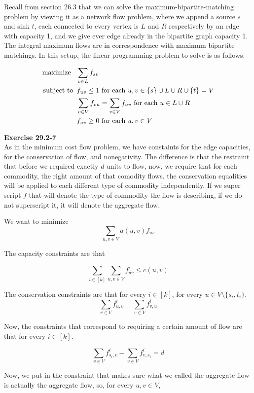 \documentclass{article}
\begin{document}
Recall from section 26.3 that we can solve the maximum-bipartite-matching problem by viewing it as a network flow problem, where we append a source $s$ and sink $t$, each connected to every vertex is $L$ and $R$ respectively by an edge with capacity 1, and we give ever edge already in the bipartite graph capacity 1.  The integral maximum flows are in correspondence with maximum bipartite matchings. In this setup, the linear programming problem to solve is as follows:

\begin{align*}
\mbox{maximize \,\,\,} & \sum_{v \in L} f_{sv}\\
\mbox{subject to \,} & f_{uv} \leq 1 \mbox{ for each } u,v \in \{s\} \cup L \cup R \cup \{t\} = V \\
& \sum_{v \in V} f_{vu} = \sum_{v \in V} f_{uv} \mbox{ for each } u \in L \cup R \\
& f_{uv} \geq 0 \mbox{ for each } u,v \in V \\
\end{align*}

\noindent\textbf{Exercise 29.2-7}\\

As in the minimum cost flow problem, we have constaints for the edge capacities, for the conservation of flow, and nonegativity. The difference is that the restraint that before we required exactly $d$ units to flow, now, we require that for each commodity, the right amount of that comodity flows. the conservation equalities will be applied to each different type of commodity independently. If we super script $f$ that will denote the type of commodity the flow is describing, if we do not superscript it, it will denote the aggregate flow.

We want to minimize
\[
\sum_{u,v\in V}a(u,v) f_{uv}
\]

The capacity constraints are that

\[
\sum_{i\in [k]} \sum_{u,v \in V} f_{uv}^i \le c(u,v)
\]

The conservation constraints are that for every $i\in [k]$, for every $u\in V\setminus\{s_i,t_i\}$.
\[
\sum_{v\in V} f_{u,v}^i = \sum_{v\in V} f_{v,u}^i
\]

Now, the constraints that correspond to requiring a certain amount of flow are that for every $i\in [k]$.

\[
\sum_{v\in V} f_{s_i,v}^i -\sum_{v\in V} f_{v,s_i}^i = d
\]

Now, we put in the constraint that makes sure what we called the aggregate flow is actually the aggregate flow, so, for every $u,v\in V$,
\end{document}
